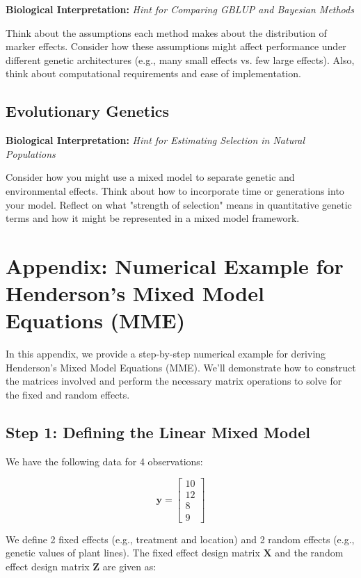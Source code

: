 \documentclass[12pt,a4paper]{article}
\newenvironment{interpretation}[1][]
{\begin{basebox}[linecolor=uqgreen]
\textbf{\color{uqgreen}Biological Interpretation:} \textit{#1}\par\noindent\ignorespaces}
{\end{basebox}}
\begin{document}
\begin{interpretation}[Hint for Comparing GBLUP and Bayesian Methods]
Think about the assumptions each method makes about the distribution of marker effects. Consider how these assumptions might affect performance under different genetic architectures (e.g., many small effects vs. few large effects). Also, think about computational requirements and ease of implementation.
\end{interpretation}

\subsection{Evolutionary Genetics}

\begin{interpretation}[Hint for Estimating Selection in Natural Populations]
Consider how you might use a mixed model to separate genetic and environmental effects. Think about how to incorporate time or generations into your model. Reflect on what "strength of selection" means in quantitative genetic terms and how it might be represented in a mixed model framework.
\end{interpretation}

\section*{Appendix: Numerical Example for Henderson's Mixed Model Equations (MME)}

In this appendix, we provide a step-by-step numerical example for deriving Henderson’s Mixed Model Equations (MME). We’ll demonstrate how to construct the matrices involved and perform the necessary matrix operations to solve for the fixed and random effects.

\subsection*{Step 1: Defining the Linear Mixed Model}

We have the following data for 4 observations:

\[
\mathbf{y} = 
\begin{bmatrix}
    10 \\
    12 \\
    8 \\
    9
\end{bmatrix}
\]

We define 2 fixed effects (e.g., treatment and location) and 2 random effects (e.g., genetic values of plant lines). The fixed effect design matrix $\mathbf{X}$ and the random effect design matrix $\mathbf{Z}$ are given as:
\end{document}
